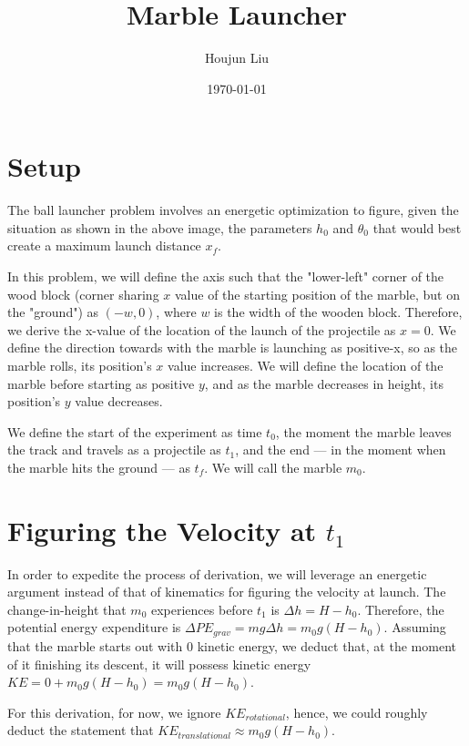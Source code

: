 \documentclass[11pt]{article}
\author{Houjun Liu}
\date{\today}
\title{Marble Launcher}
\begin{document}
\maketitle
\tableofcontents


\section{Setup}
\label{sec:orgd8a03a9}
The ball launcher problem involves an energetic optimization to figure, given the situation as shown in the above image, the parameters \(h_0\) and \(\theta_0\) that would best create a maximum launch distance \(x_f\).

In this problem, we will define the axis such that the "lower-left" corner of the wood block (corner sharing \(x\) value of the starting position of the marble, but on the "ground") as \((-w,0)\), where \(w\) is the width of the wooden block. Therefore, we derive the x-value of the location of the launch of the projectile as \(x=0\). We define the direction towards with the marble is launching as positive-x, so as the marble rolls, its position's \(x\) value increases. We will define the location of the marble before starting as positive \(y\), and as the marble decreases in height, its position's \(y\) value decreases.

We define the start of the experiment as time \(t_0\), the moment the marble leaves the track and travels as a projectile as \(t_1\), and the end --- in the moment when the marble hits the ground --- as \(t_f\). We will call the marble \(m_0\).

\section{Figuring the Velocity at \(t_1\)}
\label{sec:org84cfb1e}
In order to expedite the process of derivation, we will leverage an energetic argument instead of that of kinematics for figuring the velocity at launch. The change-in-height that \(m_0\) experiences before \(t_1\) is \(\Delta h = H-h_0\). Therefore, the potential energy expenditure is \(\Delta PE_{grav} = mg\Delta h = m_0 g (H - h_0)\). Assuming that the marble starts out with 0 kinetic energy, we deduct that, at the moment of it finishing its descent, it will possess kinetic energy \(KE = 0+m_0 g (H - h_0) = m_0 g (H - h_0)\).

For this derivation, for now, we ignore \(KE_{rotational}\), hence, we could roughly deduct the statement that \(KE_{translational} \approx m_0 g (H - h_0)\).
\end{document}
